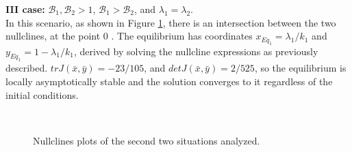 \noindent\textbf{III case:} $\mathcal{B}_1, \mathcal{B}_2 >1$, $\mathcal{B}_1 >  \mathcal{B}_2$, and $\lambda_1 = \lambda_2$. \\
In this scenario, as shown in Figure \ref{fig:nullcline_B1_mag_B2}, there is an intersection between the two nullclines, at the point 0 . The equilibrium has coordinates $x_{Eq_1} = \lambda_1/k_1$ and $y_{Eq_1} = 1 - \lambda_1/k_1 $, derived by solving the nullcline expressions as previously described. $trJ(\bar{x},\bar{y}) = -23/105$, and $detJ(\bar{x},\bar{y}) = 2/525$, so the equilibrium is locally asymptotically stable and the solution converges to it regardless of the initial conditions.\\

 
\begin{figure}[h]
	\centering
	 \quad
	 \\
	\caption[Nullclines second figure]{Nullclines plots of the second two situations analyzed.}
	\label{fig:nullcline_B1_mag_B2}
\end{figure}

